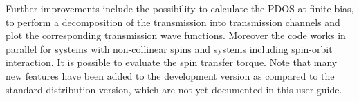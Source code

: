 \documentclass[11pt]{article}
\begin{document}
{Further improvements include the possibility to calculate the PDOS at finite bias, to perform a decomposition of the transmission into transmission channels and plot the corresponding transmission wave functions. Moreover the code works in parallel for systems with non-collinear spins and systems including spin-orbit interaction. It is possible to evaluate the spin transfer torque. Note that many new features have been added to the development version as compared to the standard distribution version, which are not yet documented in this user guide.
%
%
%
%
}
\end{document}
